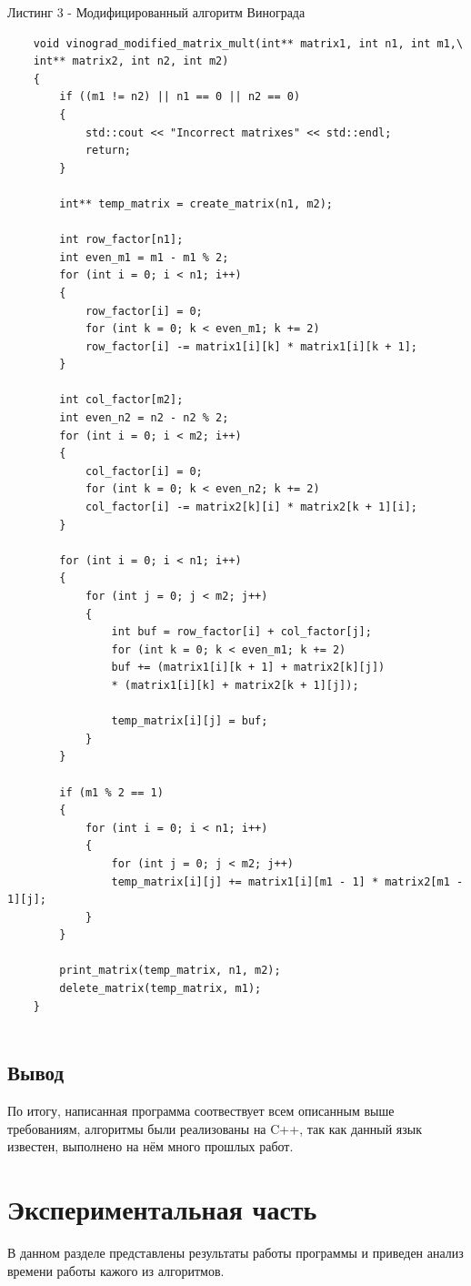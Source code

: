 \documentclass[12pt]{report}
\begin{document}
	Листинг 3 - Модифицированный алгоритм Винограда
	\begin{lstlisting}
	void vinograd_modified_matrix_mult(int** matrix1, int n1, int m1,\
	int** matrix2, int n2, int m2)
	{
		if ((m1 != n2) || n1 == 0 || n2 == 0)
		{
			std::cout << "Incorrect matrixes" << std::endl;
			return;
		}
		
		int** temp_matrix = create_matrix(n1, m2);
		
		int row_factor[n1];
		int even_m1 = m1 - m1 % 2;
		for (int i = 0; i < n1; i++)
		{
			row_factor[i] = 0;
			for (int k = 0; k < even_m1; k += 2)
			row_factor[i] -= matrix1[i][k] * matrix1[i][k + 1];
		}
		
		int col_factor[m2];
		int even_n2 = n2 - n2 % 2;
		for (int i = 0; i < m2; i++)
		{
			col_factor[i] = 0;
			for (int k = 0; k < even_n2; k += 2)
			col_factor[i] -= matrix2[k][i] * matrix2[k + 1][i];
		}
		
		for (int i = 0; i < n1; i++)
		{
			for (int j = 0; j < m2; j++)
			{
				int buf = row_factor[i] + col_factor[j];
				for (int k = 0; k < even_m1; k += 2)
				buf += (matrix1[i][k + 1] + matrix2[k][j])
				* (matrix1[i][k] + matrix2[k + 1][j]);
				
				temp_matrix[i][j] = buf;
			}
		}
		
		if (m1 % 2 == 1)
		{
			for (int i = 0; i < n1; i++)
			{
				for (int j = 0; j < m2; j++)
				temp_matrix[i][j] += matrix1[i][m1 - 1] * matrix2[m1 - 1][j];
			}
		}
		
		print_matrix(temp_matrix, n1, m2);
		delete_matrix(temp_matrix, m1);
	}
	
	\end{lstlisting}
	\newpage
	
	\section*{Вывод}
	По итогу, написанная программа соотвествует всем описанным выше требованиям, алгоритмы были реализованы на C++, так как данный язык известен, выполнено на нём много прошлых работ. 
	
	
	\chapter{Экспериментальная часть}
	В данном разделе представлены результаты работы программы и приведен анализ времени работы кажого из алгоритмов.
	
\end{document}
